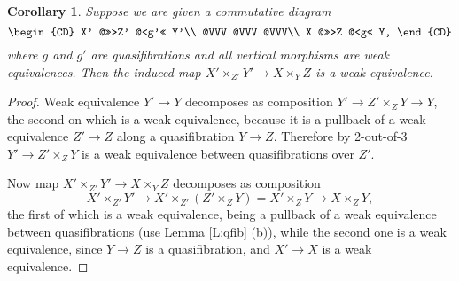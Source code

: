 \documentclass[12pt]{amsart}
\theoremstyle{plain}
\newtheorem{Cor}[Thm]{Corollary}
\theoremstyle{definition}
\newtheorem{Emp}[Thm]{}
\numberwithin{equation}{section}
\newcommand{\lra}{\longrightarrow}
\newcommand{\rl}[1]{Lemma \ref{L:#1}}
\newcommand{\rco}[1]{Corollary \ref{C:#1}}
\begin{document}

\begin{Cor} \label{C:hfibprod}
Suppose we are given a commutative diagram
%
\[
\begin{CD}
X' @>>>Z' @<g'<< Y'\\
@VVV @VVV @VVV\\
X @>>>Z @<g<< Y,
\end{CD}
\]
%
where $g$ and $g'$ are quasifibrations and all vertical morphisms
are weak equivalences. Then the induced map $X'\times_{Z'} Y'\to
X\times_Y Z$ is a weak equivalence.
\end{Cor}

\begin{proof}
Weak equivalence $Y'\to Y$ decomposes as composition $Y'\to
Z'\times_{Z} Y\to Y$, the second on which is a weak equivalence,
because it is a pullback of a weak equivalence $Z'\to Z$ along a
quasifibration $Y\to Z$. Therefore by 2-out-of-3 
$Y'\to Z'\times_{Z} Y$ is a weak equivalence between
quasifibrations over $Z'$.

Now map $X'\times_{Z'} Y'\to X\times_Y Z$ decomposes as
composition
\[
X'\times_{Z'} Y'\to X'\times_{Z'}(Z'\times_{Z} Y)=X'\times_{Z}
Y\to  X\times_Z Y,
\]
the first of which is a weak equivalence, being a pullback
of a weak equivalence between quasifibrations (use \rl{qfib} (b)),
while the second one is a weak equivalence, since $Y\to Z$ is a
quasifibration, and $X'\to X$  is a weak equivalence.
\end{proof}


\end{document}
